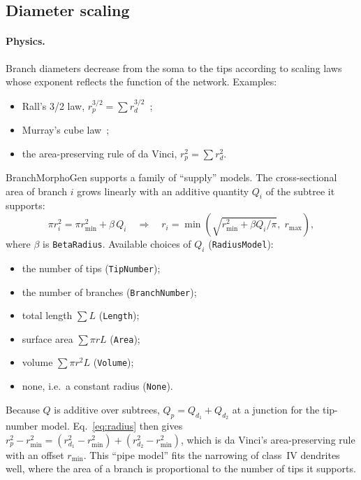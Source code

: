 \documentclass[11pt,a4paper]{article}
\newcommand{\code}[1]{\texttt{#1}}
\begin{document}
\FloatBarrier
\subsection{Diameter scaling}\label{sec:radius}
\paragraph{Physics.}
Branch diameters decrease from the soma to the tips according to scaling laws whose exponent reflects the function of the network. Examples:
\begin{itemize}
  \item Rall's 3/2 law, $r_p^{3/2}=\sum r_d^{3/2}$~\cite{Rall1959};
  \item Murray's cube law~\cite{Murray1926};
  \item the area-preserving rule of da Vinci, $r_p^2=\sum r_d^2$.
\end{itemize}
BranchMorphoGen supports a family of ``supply'' models. The cross-sectional area of branch $i$ grows linearly with an additive quantity $Q_i$ of the subtree it supports:
\begin{equation}
  \pi r_i^2 = \pi r_\text{min}^2+\beta\,Q_i \quad\Longrightarrow\quad
  r_i=\min\!\left(\sqrt{r_\text{min}^2+\beta Q_i/\pi},\;r_\text{max}\right),
  \label{eq:radius}
\end{equation}
where $\beta$ is \code{BetaRadius}. Available choices of $Q_i$ (\code{RadiusModel}):
\begin{itemize}
  \item the number of tips (\code{TipNumber});
  \item the number of branches (\code{BranchNumber});
  \item total length $\sum L$ (\code{Length});
  \item surface area $\sum\pi r L$ (\code{Area});
  \item volume $\sum\pi r^2L$ (\code{Volume});
  \item none, i.e.\ a constant radius (\code{None}).
\end{itemize}
Because $Q$ is additive over subtrees, $Q_p=Q_{d_1}+Q_{d_2}$ at a junction for the tip-number model. Eq.~\eqref{eq:radius} then gives $r_p^2-r_\text{min}^2=(r_{d_1}^2-r_\text{min}^2)+(r_{d_2}^2-r_\text{min}^2)$, which is da Vinci's area-preserving rule with an offset $r_\text{min}$. This ``pipe model'' fits the narrowing of class~IV dendrites well, where the area of a branch is proportional to the number of tips it supports.
\end{document}
